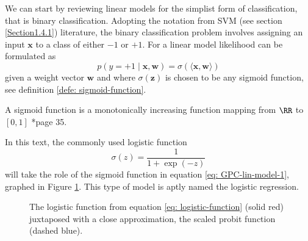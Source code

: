 We can start by reviewing linear models for the simplist form of classification, that is binary classification. Adopting the notation from SVM (see section \ref{Section1.4.1}) literature, the binary classification problem involves assigning an input $\bm{x}$ to a class of either $-1$ or $+1$. For a linear model likelihood can be formulated as
\begin{equation} \label{eq: GPC-lin-model-1}
    p \left( y=+1 \mid \bm{x} , \bm{w} \right) = \sigma \left( \langle \bm{x} , \bm{w} \rangle \right)
\end{equation}
given a weight vector $\bm{w}$ and where $\sigma (\bm{z})$ is chosen to be any sigmoid function, see definition \ref{defe: sigmoid-function}.
\begin{defe} \label{defe: sigmoid-function}
    A sigmoid function is a monotonically increasing function mapping from $\RR$ to $\left[ 0,1 \right]$ \cite{RasmussenCarlEdward2006Gpfm}*{page 35}.
\end{defe}
In this text, the commonly used logistic function
\begin{equation} \label{eq: logistic-function}
    \sigma (z) = \frac{1}{1 + \exp (-z)}
\end{equation}
will take the role of the sigmoid function in equation \ref{eq: GPC-lin-model-1}, graphed in Figure \ref{fig: logistic-func-and-probit}. This type of model is aptly named the logistic regression.
\begin{figure}[h]
    \centering
    \caption{The logistic function from equation \ref{eq: logistic-function} (solid red) juxtaposed with a close approximation, the scaled probit function (dashed blue).}
    \label{fig: logistic-func-and-probit}
\end{figure}
